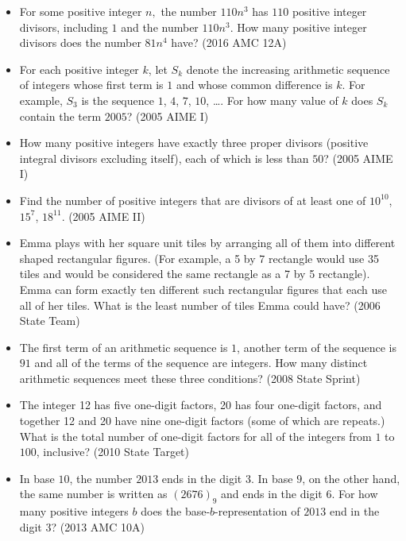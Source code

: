 \documentclass{article}
\begin{document}
\begin{itemize}
\item For some positive integer $n,$ the number $110n^3$ has $110$ positive integer divisors, including $1$ and the number $110n^3.$ How many positive integer divisors does the number $81n^4$ have? (2016 AMC 12A)

\item For each positive integer $k$, let $S_k$ denote the increasing arithmetic sequence of integers whose first term is $1$ and whose common difference is $k$. For example, $S_3$ is the sequence $1$, $4$, $7$, $10$, \ldots. For how many value of $k$ does $S_k$ contain the term $2005$? (2005 AIME I)

\item How many positive integers have exactly three proper divisors (positive integral divisors excluding itself), each of which is less than $50$? (2005 AIME I)

\item Find the number of positive integers that are divisors of at least one of $10^{10}$, $15^7$, $18^{11}$. (2005 AIME II)

\item Emma plays with her square unit tiles by arranging all of them into different shaped rectangular figures. (For example, a 5 by 7 rectangle would use 35 tiles and would be considered the same rectangle as a 7 by 5 rectangle). Emma can form exactly ten different such rectangular figures that each use all of her tiles. What is the least number of tiles Emma could have? (2006 State Team)

\item The first term of an arithmetic sequence is $1$, another term of the sequence is $91$ and all of the terms of the sequence are integers. How many distinct arithmetic sequences meet these three conditions? (2008 State Sprint)

\item The integer 12 has five one-digit factors, 20 has four one-digit factors, and together 12 and 20 have nine one-digit factors (some of which are repeats.) What is the total number of one-digit factors for all of the integers from $1$ to $100$, inclusive? (2010 State Target)

\item In base $10$, the number $2013$ ends in the digit $3$. In base $9$, on the other hand, the same number is written as $(2676)_9$ and ends in the digit $6$. For how many positive integers $b$ does the base-$b$-representation of $2013$ end in the digit $3$? (2013 AMC 10A)


\end{itemize}
\end{document}
